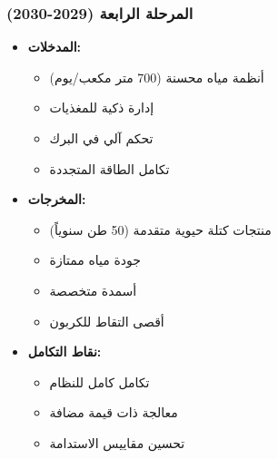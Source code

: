\subsubsection{المرحلة الرابعة (2029-2030)}
\begin{itemize}
    \item \textbf{المدخلات:}
    \begin{itemize}
        \item أنظمة مياه محسنة (700 متر مكعب/يوم)
        \item إدارة ذكية للمغذيات
        \item تحكم آلي في البرك
        \item تكامل الطاقة المتجددة
    \end{itemize}
    \item \textbf{المخرجات:}
    \begin{itemize}
        \item منتجات كتلة حيوية متقدمة (50 طن سنوياً)
        \item جودة مياه ممتازة
        \item أسمدة متخصصة
        \item أقصى التقاط للكربون
    \end{itemize}
    \item \textbf{نقاط التكامل:}
    \begin{itemize}
        \item تكامل كامل للنظام
        \item معالجة ذات قيمة مضافة
        \item تحسين مقاييس الاستدامة
    \end{itemize}
\end{itemize}

